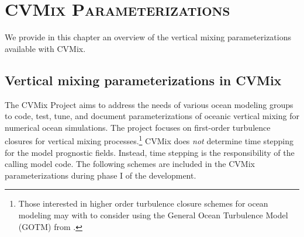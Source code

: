 \chapter{\scshape CVMix Parameterizations}
\label{chapter:cvmix_intro}

\minitoc
\vspace{.5cm}

We provide in this chapter an overview of the vertical mixing
parameterizations available with CVMix.


\section{Vertical mixing parameterizations in CVMix}
\label{section:vert_mix_schemes_cvmix}

The CVMix Project aims to address the needs of various ocean modeling
groups to code, test, tune, and document parameterizations of oceanic
vertical mixing for numerical ocean simulations.  The project focuses
on first-order turbulence closures for vertical mixing
processes.\footnote{Those interested in higher order turbulence
  closure schemes for ocean modeling may with to consider using the
  General Ocean Turbulence Model (GOTM) from \cite{GOTM}.}  CVMix does
{\it not} determine time stepping for the model prognostic fields.
Instead, time stepping is the responsibility of the calling model
code.  The following schemes are included in the CVMix
parameterizations during phase I of the development.

